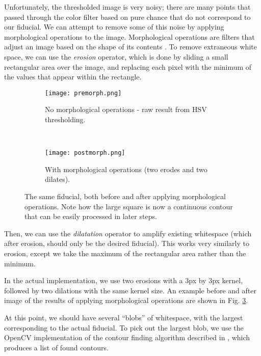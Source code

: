 \documentclass[letterpaper, 10 pt, conference]{ieeeconf}  %
\begin{document}
Unfortunately, the thresholded image is very noisy; there are many points that passed through the color filter based on pure chance that do not correspond to our fiducial. We can attempt to remove some of this noise by applying morphological operations to the image. Morphological operations are filters that adjust an image based on the shape of its contents \cite{OpenCV:morph}. To remove extraneous white space, we can use the \emph{erosion} operator, which is done by sliding a small rectangular area over the image, and replacing each pixel with the minimum of the values that appear within the rectangle. 

\begin{figure}[h]
        \centering
         \begin{subfigure}[b]{0.2\textwidth}
                \texttt{[image: premorph.png]}
                \caption{No morphological operations - raw result from HSV thresholding.}
                \label{fig:premorph}
        \end{subfigure}
        ~
        \begin{subfigure}[b]{0.2\textwidth}
                \texttt{[image: postmorph.png]}
                \caption{With morphological operations (two erodes and two dilates).}
                \label{fig:postmorph}
        \end{subfigure}
        \caption{The same fiducial, both before and after applying morphological operations. Note how the large square is now a continuous contour that can be easily processed in later steps.}
        \label{fig:morph}
\end{figure}

Then, we can use the \emph{dilatation} operator to amplify existing whitespace (which after erosion, should only be the desired fiducial). This works very similarly to erosion, except we take the maximum of the rectangular area rather than the minimum. 

In the actual implementation, we use two erosions with a 3px by 3px kernel, followed by two dilations with the same kernel size.  An example before and after image of the results of applying morphological operations are shown in Fig. \ref{fig:morph}.

At this point, we should have several ``blobs'' of whitespace, with the largest corresponding to the actual fiducial. To pick out the largest blob, we use the OpenCV implementation of the contour finding algorithm described in \cite{Suzuki:85}, which produces a list of found contours. 
\end{document}
